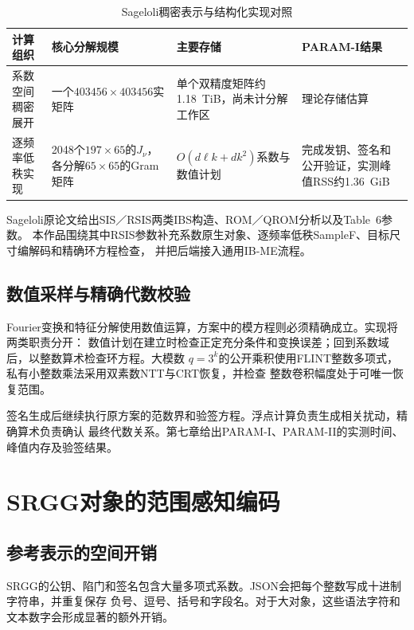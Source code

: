 \begin{table}[H]
\centering\small
\caption{Sageloli稠密表示与结构化实现对照}
\label{tab:sageloli-representation}
\begin{tabularx}{\textwidth}{@{}>{\raggedright\arraybackslash}p{}>{\raggedright\arraybackslash}p{}>{\raggedright\arraybackslash}p{}>{\raggedright\arraybackslash}X@{}}
\toprule
\rowcolor{black!8} 计算组织 & 核心分解规模 & 主要存储 & PARAM-I结果 \\
\midrule
系数空间稠密展开 & 一个$403456\times403456$实矩阵 & 单个双精度矩阵约1.18~TiB，尚未计分解工作区 & 理论存储估算 \\
逐频率低秩实现 & 2048个$197\times65$的$J_\nu$，各分解$65\times65$的Gram矩阵 & $O(d\ell k+dk^2)$系数与数值计划 & 完成发钥、签名和公开验证，实测峰值RSS约1.36~GiB \\
\bottomrule
\end{tabularx}
\end{table}

Sageloli原论文给出SIS／RSIS两类IBS构造、ROM／QROM分析以及Table~6参数\cite{sageloli2023ibs}。
本作品围绕其中RSIS参数补充系数原生对象、逐频率低秩SampleF、目标尺寸编解码和精确环方程检查，
并把后端接入通用IB-ME流程。

\subsection{数值采样与精确代数校验}

Fourier变换和特征分解使用数值运算，方案中的模方程则必须精确成立。实现将两类职责分开：
数值计划在建立时检查正定充分条件和变换误差；回到系数域后，以整数算术检查环方程。大模数
$q=3^k$的公开乘积使用FLINT整数多项式，私有小整数乘法采用双素数NTT与CRT恢复，并检查
整数卷积幅度处于可唯一恢复范围。

签名生成后继续执行原方案的范数界和验签方程。浮点计算负责生成相关扰动，精确算术负责确认
最终代数关系。第七章给出PARAM-I、PARAM-II的实测时间、峰值内存及验签结果。

\section{SRGG对象的范围感知编码}
\label{sec:srgg-codec}

\subsection{参考表示的空间开销}

SRGG的公钥、陷门和签名包含大量多项式系数。JSON会把每个整数写成十进制字符串，并重复保存
负号、逗号、括号和字段名。对于大对象，这些语法字符和文本数字会形成显著的额外开销。

